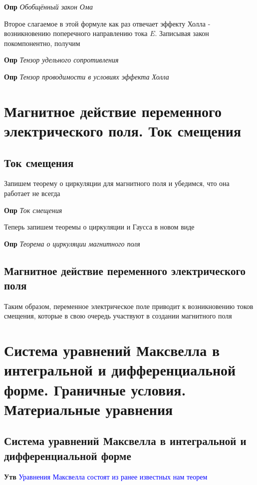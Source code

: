 \documentclass[a4paper, 14pt]{article}
\begin{document}
    \textbf{Опр} \textit{Обобщённый закон Ома}
    
    Второе слагаемое в этой формуле как раз отвечает эффекту Холла - возникновению поперечного направлению тока $E$.
    Записывая закон покомпонентно, получим
    
    \textbf{Опр} \textit{Тензор удельного сопротивления}
    
    \textbf{Опр} \textit{Тензор проводимости в условиях эффекта Холла}
    
    \section{Магнитное действие переменного электрического поля.
    Ток смещения}
    
    \subsection{Ток смещения}
    
    Запишем теорему о циркуляции для магнитного поля и убедимся, что она работает не всегда
    
    \textbf{Опр} \textit{Ток смещения}
    
    Теперь запишем теоремы о циркуляции и Гаусса в новом виде
    
    \textbf{Опр} \textit{Теорема о циркуляции магнитного поля}
    
    \subsection{Магнитное действие переменного электрического поля}
    
    Таким образом, переменное электрическое поле приводит к возникновению токов смещения, которые в свою очередь
    участвуют в создании магнитного поля
    
    \section{Система уравнений Максвелла в интегральной и дифференциальной форме.
    Граничные условия.
    Материальные уравнения}
    
    \subsection{Система уравнений Максвелла в интегральной и дифференциальной форме}
    
    \textbf{Утв} \textcolor{blue}{Уравнения Максвелла состоят из ранее известных нам теорем}
    
\end{document}
